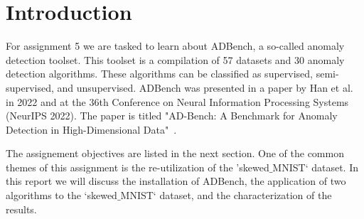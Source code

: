 \section{Introduction}
For assignment 5 we are tasked to learn about ADBench, a so-called anomaly detection toolset. 
This toolset is a compilation of 57 datasets and 30 anomaly detection algorithms. These algorithms
can be classified as supervised, semi-supervised, and unsupervised. ADBench was
presented in a paper by Han et al. in 2022 and at the 36th Conference on Neural 
Information Processing Systems (NeurIPS 2022). The paper is titled "AD-Bench: A Benchmark for Anomaly Detection in High-Dimensional Data"\ \cite{han2022adbench}.

The assignement objectives are listed in the next section. One of the common themes of this assignment is the re-utilization of the 'skewed$\_$MNIST` dataset.
In this report we will discuss the installation of ADBench, the application of two algorithms to the `skewed$\_$MNIST` dataset, and the characterization of the results.

